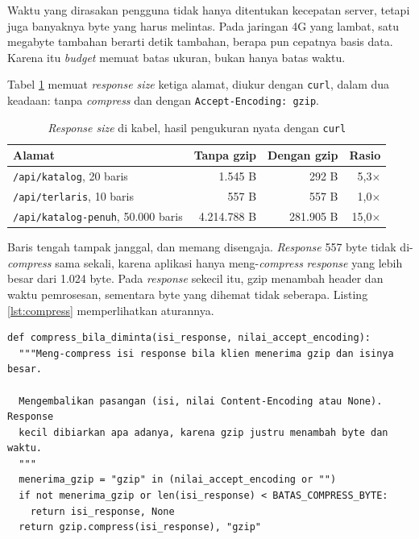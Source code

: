 Waktu yang dirasakan pengguna tidak hanya ditentukan kecepatan server, tetapi
juga banyaknya byte yang harus melintas. Pada jaringan 4G yang lambat, satu
megabyte tambahan berarti detik tambahan, berapa pun cepatnya basis data.
Karena itu \textit{budget} memuat batas ukuran, bukan hanya batas waktu.

Tabel \ref{tab:ukuran-response} memuat \textit{response size} ketiga alamat, diukur
dengan \texttt{curl}, dalam dua keadaan: tanpa \textit{compress} dan dengan
\texttt{Accept-Encoding: gzip}.

\begin{table}[!htb]
  \centering
  \caption{\textit{Response size} di kabel, hasil pengukuran nyata dengan
           \texttt{curl}}
  \label{tab:ukuran-response}
  \begin{tabularx}{\textwidth}{Xrrr}
    \hline
    \textbf{Alamat} & \textbf{Tanpa gzip} & \textbf{Dengan gzip} & \textbf{Rasio} \\
    \hline
    \texttt{/api/katalog}, 20 baris & 1.545 B & 292 B & 5,3$\times$ \\
    \hline
    \texttt{/api/terlaris}, 10 baris & 557 B & 557 B & 1,0$\times$ \\
    \hline
    \texttt{/api/katalog-penuh}, 50.000 baris & 4.214.788 B & 281.905 B & 15,0$\times$ \\
    \hline
  \end{tabularx}
\end{table}

Baris tengah tampak janggal, dan memang disengaja. \textit{Response} 557 byte tidak
di-\textit{compress} sama sekali, karena aplikasi hanya meng-\textit{compress}
\textit{response} yang lebih besar dari 1.024 byte. Pada \textit{response} sekecil itu, gzip
menambah header dan waktu pemrosesan, sementara byte yang dihemat tidak
seberapa. Listing \ref{lst:compress} memperlihatkan aturannya.

\begin{lstlisting}[style=PythonStyle, caption={Aturan kapan response di-compress, tersedia di \berkas{sources/chapter05/aplikasi.py}}, label={lst:compress}]
def compress_bila_diminta(isi_response, nilai_accept_encoding):
  """Meng-compress isi response bila klien menerima gzip dan isinya besar.

  Mengembalikan pasangan (isi, nilai Content-Encoding atau None). Response
  kecil dibiarkan apa adanya, karena gzip justru menambah byte dan waktu.
  """
  menerima_gzip = "gzip" in (nilai_accept_encoding or "")
  if not menerima_gzip or len(isi_response) < BATAS_COMPRESS_BYTE:
    return isi_response, None
  return gzip.compress(isi_response), "gzip"
\end{lstlisting}

